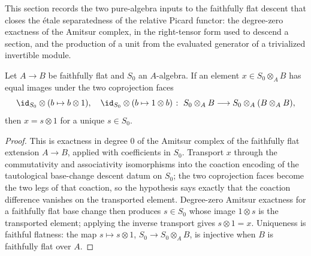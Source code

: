 This section records the two pure-algebra inputs to the faithfully flat descent that closes
the \'etale separatedness of the relative Picard functor: the degree-zero exactness of the
Amitsur complex, in the right-tensor form used to descend a section, and the production of a
unit from the evaluated generator of a trivialized invertible module.

\begin{theorem}
  \label{thm:descent_existsUnique_tmul_one}
  \leanok
  Let \(A \to B\) be faithfully flat and \(S_0\) an \(A\)-algebra. If an element \(x \in S_0
  \otimes_A B\) has equal images under the two coprojection faces
  \[
    \id_{S_0} \otimes (b \mapsto b \otimes 1), \quad \id_{S_0} \otimes (b \mapsto 1 \otimes b)
    \;\colon\; S_0 \otimes_A B \longrightarrow S_0 \otimes_A (B \otimes_A B),
  \]
  then \(x = s \otimes 1\) for a unique \(s \in S_0\).
\end{theorem}
\begin{proof}
  \leanok
  This is exactness in degree \(0\) of the Amitsur complex of the faithfully flat extension
  \(A \to B\), applied with coefficients in \(S_0\).  Transport \(x\) through the
  commutativity and associativity isomorphisms into the coaction encoding of the tautological
  base-change descent datum on \(S_0\); the two coprojection faces become the two legs of that
  coaction, so the hypothesis says exactly that the coaction difference vanishes on the
  transported element.  Degree-zero Amitsur exactness for a faithfully flat base change then
  produces \(s \in S_0\) whose image \(1 \otimes s\) is the transported element; applying the
  inverse transport gives \(s \otimes 1 = x\).  Uniqueness is faithful flatness: the map \(s
  \mapsto s \otimes 1\), \(S_0 \to S_0 \otimes_A B\), is injective when \(B\) is faithfully
  flat over \(A\).
\end{proof}

